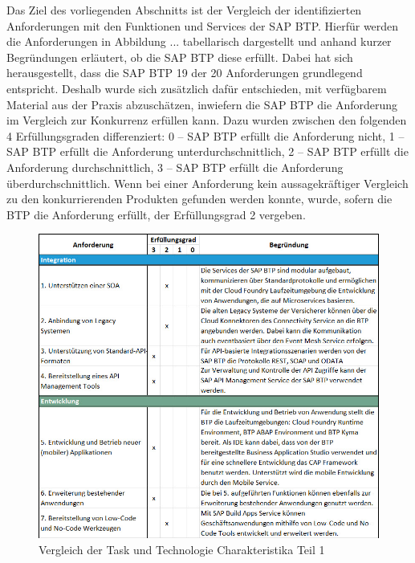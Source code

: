 Das Ziel des vorliegenden Abschnitts ist der Vergleich der identifizierten Anforderungen mit den Funktionen und Services der SAP BTP. Hierfür werden die Anforderungen in Abbildung ... tabellarisch dargestellt und anhand kurzer Begründungen erläutert, ob die SAP BTP diese erfüllt. Dabei hat sich herausgestellt, dass die SAP BTP 19 der 20 Anforderungen grundlegend entspricht. Deshalb wurde sich zusätzlich dafür entschieden, mit verfügbarem Material aus der Praxis abzuschätzen, inwiefern die SAP BTP die Anforderung im Vergleich zur Konkurrenz erfüllen kann. Dazu wurden zwischen den folgenden 4 Erfüllungsgraden differenziert: 0 – SAP BTP erfüllt die Anforderung nicht, 1 – SAP BTP erfüllt die Anforderung unterdurchschnittlich, 2 – SAP BTP erfüllt die Anforderung durchschnittlich, 3 – SAP BTP erfüllt die Anforderung überdurchschnittlich. Wenn bei einer Anforderung kein aussagekräftiger Vergleich zu den konkurrierenden Produkten gefunden werden konnte, wurde, sofern die BTP die Anforderung erfüllt, der Erfüllungsgrad 2 vergeben.

\begin{figure}[ht]
    \centering
    \includegraphics[width=1\textwidth]{img/TTFTeil1E2.jpg}
    \caption[Vergleich der Task und Technologie Charakteristika Teil 1]{Vergleich der Task und Technologie Charakteristika Teil 1\autocite{TFTeil1}}
    \label{fig:TTFTeil1}
\end{figure}

